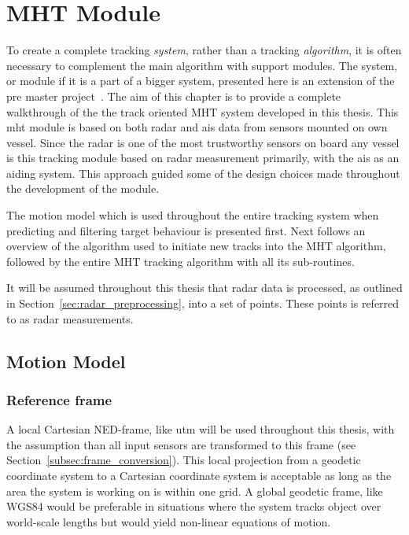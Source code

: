 
\chapter{MHT Module}\label{chapter:mht-module}
To create a complete tracking \emph{system}, rather than a tracking \emph{\gls{algorithm}}, it is often necessary to complement the main algorithm with support modules. The system, or module if it is a part of a bigger system, presented here is an extension of the pre master project~\cite{Liland_2017}. The aim of this chapter is to provide a complete walkthrough of the the track oriented MHT system developed in this thesis. This \gls{mht} module is based on both radar and \gls{ais} data from sensors mounted on own vessel. Since the radar is one of the most trustworthy sensors on board any vessel is this tracking module based on radar measurement primarily, with the \gls{ais} as an aiding system. This approach guided some of the design choices made throughout the development of the module. 

The motion model which is used throughout the entire tracking system when predicting and filtering target behaviour is presented first. Next follows an overview of the algorithm used to initiate new tracks into the MHT algorithm, followed by the entire MHT tracking algorithm with all its sub-routines.

It will be assumed throughout this thesis that radar data is processed, as outlined in Section~\ref{sec:radar_preprocessing}, into a set of points. These points is referred to as radar measurements.

\section{Motion Model}\label{sec:motion-model}
\subsection{Reference frame}
A local Cartesian NED-frame, like \gls{utm} will be used throughout this thesis, with the assumption than all input sensors are transformed to this frame (see Section~\ref{subsec:frame_conversion}). This local projection from a geodetic coordinate system to a Cartesian coordinate system is acceptable as long as the area the system is working on is within one grid. A global geodetic frame, like WGS84 would be preferable in situations where the system tracks object over world-scale lengths but would yield non-linear equations of motion.


